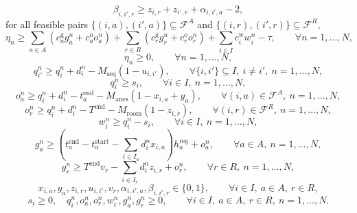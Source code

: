 \documentclass[11pt,a4paper]{article}
\begin{document}
\begin{equation}
\beta_{i,i',r} \ge z_{i,r} + z_{i',r} + \alpha_{i,i',a} - 2,
\tag{M15}
\end{equation}
for all feasible pairs
$\{(i,a),(i',a)\}\subseteq \mathcal{F}^A$ and
$\{(i,r),(i',r)\}\subseteq \mathcal{F}^R$,
\begin{equation}
\eta_n \ge
\sum_{a \in A} \left(c_a^{\mathrm g} g_a^n + c_a^{\mathrm o} o_a^n\right)
+ \sum_{r \in R} \left(c_r^{\mathrm g} g_r^n + c_r^{\mathrm o} o_r^n\right)
+ \sum_{i \in I} c_i^{\mathrm w} w_i^n
- \tau,
\qquad \forall n=1,\dots,N,
\tag{M16}
\end{equation}
\begin{equation}
\eta_n \ge 0,
\qquad \forall n=1,\dots,N,
\tag{M17}
\end{equation}
\begin{equation}
q_{i'}^n \ge q_i^n + d_i^n - M_{\mathrm{seq}}(1-u_{i,i'}),
\qquad
\forall \{i,i'\}\subseteq I,\ i\neq i',\ n=1,\dots,N,
\tag{M18}
\end{equation}
\begin{equation}
q_i^n \ge s_i,
\qquad \forall i \in I,\ n=1,\dots,N,
\tag{M19}
\end{equation}
\begin{equation}
o_a^n \ge q_i^n + d_i^n - t_a^{\mathrm{end}} - M_{\mathrm{anes}}(1-x_{i,a}+y_a),
\qquad
\forall (i,a)\in \mathcal{F}^A,\ n=1,\dots,N,
\tag{M20}
\end{equation}
\begin{equation}
o_r^n \ge q_i^n + d_i^n - T^{\mathrm{end}} - M_{\mathrm{room}}(1-z_{i,r}),
\qquad
\forall (i,r)\in \mathcal{F}^R,\ n=1,\dots,N,
\tag{M21}
\end{equation}
\begin{equation}
w_i^n \ge q_i^n - s_i,
\qquad \forall i \in I,\ n=1,\dots,N,
\tag{M22}
\end{equation}
\begin{equation}
g_a^n \ge
\left(t_a^{\mathrm{end}} - t_a^{\mathrm{start}} - \sum_{i \in I_a} d_i^n x_{i,a}\right) h_a^{\mathrm{reg}}
+ o_a^n,
\qquad \forall a \in A,\ n=1,\dots,N,
\tag{M23}
\end{equation}
\begin{equation}
g_r^n \ge
T^{\mathrm{end}} v_r - \sum_{i \in I_r} d_i^n z_{i,r} + o_r^n,
\qquad \forall r \in R,\ n=1,\dots,N,
\tag{M24}
\end{equation}
\begin{equation}
x_{i,a}, y_a, z_{i,r}, u_{i,i'}, v_r, \alpha_{i,i',a}, \beta_{i,i',r} \in \{0,1\},
\qquad \forall i \in I,\ a \in A,\ r \in R,
\tag{M25}
\end{equation}
\begin{equation}
s_i \ge 0,
\quad
q_i^n, o_a^n, o_r^n, w_i^n, g_a^n, g_r^n \ge 0,
\qquad \forall i \in I,\ a \in A,\ r \in R,\ n=1,\dots,N.
\tag{M26}
\end{equation}
\end{document}
